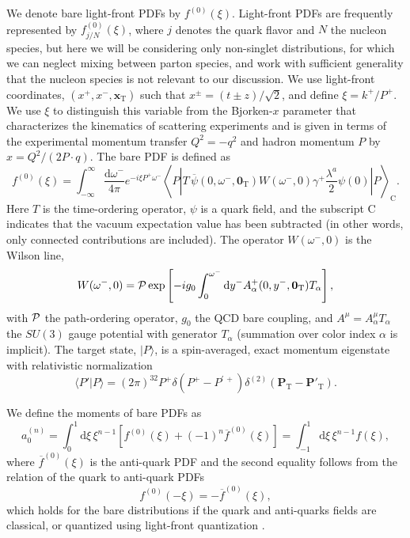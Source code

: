 We denote bare light-front PDFs by 
$f^{(0)}(\xi)$. Light-front PDFs are frequently represented by 
$f_{j/N}^{(0)}(\xi)$, where $j$ 
denotes the quark flavor and $N$ the nucleon 
species, but here we will be considering only non-singlet distributions, for 
which we can neglect mixing between parton species, and work with sufficient 
generality that the nucleon species is not relevant to our discussion. We 
use light-front coordinates, 
$(x^+,x^-,\boldsymbol{x}_\mathrm{T})$ such that $x^\pm = (t\pm z)/\sqrt{2}$, 
and define $\xi=k^+/P^+$. We use $\xi$ to distinguish this variable from the 
Bjorken-$x$ parameter that characterizes the kinematics of scattering 
experiments and is given in 
terms of the experimental momentum transfer $Q^2=-q^2$ and hadron momentum $P$ 
by $x=Q^2/(2P\cdot q)$. The bare PDF is defined as \cite{Collins:2011zzd}
\begin{equation}
f^{(0)}(\xi) = \int_{-\infty}^\infty 
\frac{\mathrm{d}\omega^-}{4\pi}
e^{-i\xi P^+\omega^-} \left\langle P \left| 
T\,\overline{\psi}(0,\omega^-,\mathbf{0}_\mathrm{T})
W(\omega^-,0)\gamma^+\frac{\lambda^a}{2}\psi(0) \right| 
P\right\rangle_\mathrm{C}.
\end{equation}
Here $T$ is the 
time-ordering operator, $\psi$ is a quark 
field, and the subscript C indicates that the vacuum 
expectation value has been subtracted (in other words, only connected 
contributions are included). The operator $W(\omega^-,0)$ is the Wilson line,
\begin{equation}
W(\omega^-,0) = 
{\cal P}\exp\left[-ig_0\int_0^{\omega^-}\mathrm{d}y^-A^+_\alpha(0,y^-,
\mathbf{0}_{\mathrm{T}})T_\alpha\right],
\end{equation}
with ${\cal P}$ the path-ordering operator, $g_0$ the QCD bare coupling, 
and $A^\mu = A^\mu_\alpha T_\alpha$ the $SU(3)$ gauge potential with generator 
$T_\alpha$ (summation over color index $\alpha$ is implicit). The target 
state, $|P\rangle$, is a spin-averaged, exact momentum eigenstate with 
relativistic normalization
\begin{equation}
\langle P' | P \rangle = 
(2\pi)^32P^+\delta\left(P^+-P^{\prime\,+}\right)\delta^{(2)}
\left(\mathbf{P}_\mathrm{T} - \mathbf{P}'_\mathrm{T}\right).
\end{equation}

We define the moments of bare PDFs as
\begin{equation}
a_{0}^{(n)} = \int_0^1 \mathrm{d}\xi\,\xi^{n-1}\left[
f^{(0)}(\xi)+(-1)^n\overline{f}^{(0)}(\xi)\right] = \int_{-1}^1 
\mathrm{d}\xi\,\xi^{n-1}
f(\xi),
\end{equation}
where $\overline{f}^{(0)}(\xi)$ is the anti-quark PDF and the second equality 
follows from the relation of the quark to 
anti-quark PDFs
\begin{equation}\label{eq:pdf2apdf}
f^{(0)}(-\xi) = -\overline{f}^{(0)}(\xi),
\end{equation}
which holds for the bare distributions if the quark and anti-quarks fields are 
classical, or quantized using light-front quantization \cite{Collins:1981uw}.

